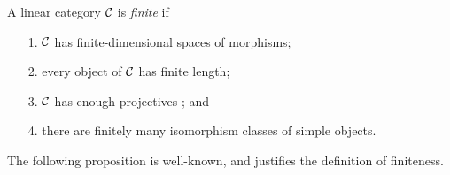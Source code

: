 \documentclass{amsart}
\begin{document}
\begin{definition} %
	A linear category $\mathcal C$ is {\em finite} if 
	\begin{enumerate}
		\item[1.] $\mathcal C$ has finite-dimensional spaces of morphisms;
		\item[2.] every object of $\mathcal C$ has finite length;
		\item[3.] $\mathcal C$ has enough projectives%
		; and
		\item[4.] there are finitely many isomorphism classes of simple objects.  
	\end{enumerate}
\end{definition}

The following proposition is well-known, and justifies the definition of finiteness.
\end{document}
